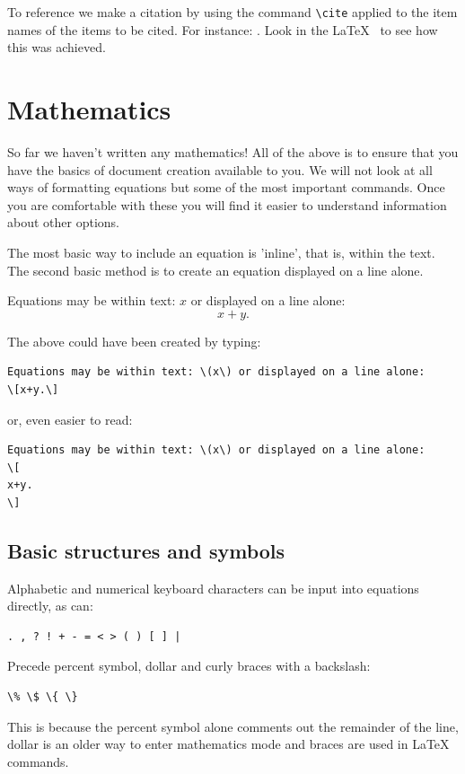 \documentclass[a4paper,14pt]{extarticle}
\begin{document}
To reference we make a citation by using the command \verb=\cite= applied to the item names of the items to be cited. For instance: \cite{latex,ctan}. Look in the \LaTeX~ to see how this was achieved. 

\section{Mathematics}

So far we haven't written any mathematics! All of the above is to ensure that you have the basics of document creation available to you. We will not look at all ways of formatting equations but some of the most important commands. Once you are comfortable with these you will find it easier to understand information about other options. 

The most basic way to include an equation is 'inline', that is, within the text. The second basic method is to create an equation displayed on a line alone.  

Equations may be within text: \(x\) or displayed on a line alone: \[x+y.\] 

The above could have been created by typing:
\begin{verbatim}
Equations may be within text: \(x\) or displayed on a line alone: 
\[x+y.\] 
\end{verbatim}
or, even easier to read:
\begin{verbatim}
Equations may be within text: \(x\) or displayed on a line alone: 
\[
x+y.
\] 
\end{verbatim}


\subsection{Basic structures and symbols}

Alphabetic and numerical keyboard characters can be input into equations directly, as can: 
\begin{verbatim}
. , ? ! + - = < > ( ) [ ] |
\end{verbatim}

Precede percent symbol, dollar and curly braces with a backslash: 
\begin{verbatim}
\% \$ \{ \} 
\end{verbatim}
This is because the percent symbol alone comments out the remainder of the line, dollar is an older way to enter mathematics mode and braces are used in \LaTeX~ commands. 
\end{document}
